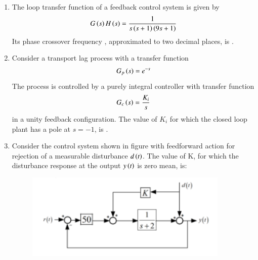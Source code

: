 \documentclass[journal,12pt,onecolumn]{IEEEtran}
\theoremstyle{remark}
\begin{document}
\begin{enumerate}
    \item The loop transfer function of a feedback control system is given by 
    \begin{align*}
        G\left(s\right)H\left(s\right) = \frac{1}{s\left(s+1\right)\left(9s+1\right)}
    \end{align*}
    Its phase crossover frequency , approximated to two decimal places, is \underline{\hspace{2cm}}.

    \hfill{}

    
    
    \item Consider a transport lag process with a transfer function 
    \begin{align*}
    G_p\left(s\right) = e^{-s}
    \end{align*}
    The process is controlled by a purely integral controller with transfer function 
    \begin{align*}
    G_c\left(s\right) = \frac{K_i}{s}
    \end{align*}
    in a unity feedback configuration. The value of $K_i$ for which the closed loop plant has a pole at $s = -1$, is \underline{\hspace{2cm}}.

    \hfill{}

    

    \item Consider the control system shown in figure with feedforward action for rejection of a measurable disturbance $d\left(t\right)$. The value of K, for which the disturbance response at the output $y\left(t\right)$ is zero mean, is:
    \begin{figure}[H]
        \centering
        \includegraphics[width=0.62\columnwidth]{q51}
        \caption*{}
        \label{fig:q51}
    \end{figure}

    \hfill{}
        \begin{enumerate}
        \end{enumerate}


\end{enumerate}
\end{document}
